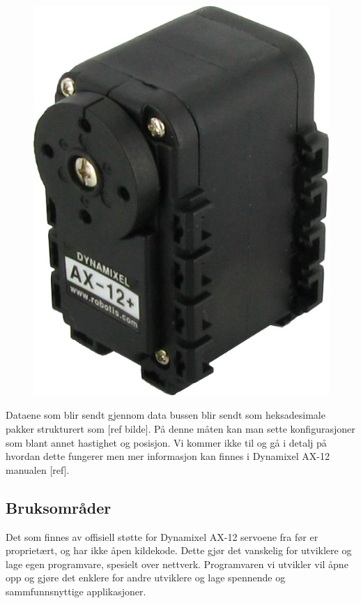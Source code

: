 \documentclass[12pt]{report}
\begin{document}
\begin{figure}[h!]
	\includegraphics[scale=0.3]{servo_ax12-5}
	\centering
\end{figure}

Dataene som blir sendt gjennom data bussen blir sendt som heksadesimale pakker strukturert som [ref bilde]. På denne måten kan man sette konfigurasjoner som blant annet hastighet og posisjon. Vi kommer ikke til og gå i detalj på hvordan dette fungerer men mer informasjon kan finnes i Dynamixel AX-12 manualen [ref].

\subsection{Bruksområder}
Det som finnes av offisiell støtte for Dynamixel AX-12 servoene fra før er proprietært, og har ikke åpen kildekode. Dette gjør det vanskelig for utviklere og lage egen programvare, spesielt over nettverk. Programvaren vi utvikler vil åpne opp og gjøre det enklere for andre utviklere og lage spennende og sammfunnsnyttige applikasjoner. 
\end{document}
